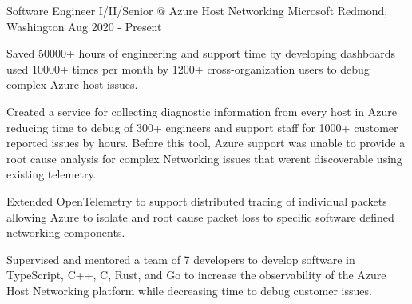 


\begin{cventries}
\cventry
  {Software Engineer I/II/Senior @ Azure Host Networking}
  {Microsoft}
  {Redmond, Washington}
  {Aug 2020 - Present}
  {
    \begin{cvitems}
      \item {Saved 50000+ hours of engineering and support time by developing
        dashboards used 10000+ times per month by 1200+ cross-organization
        users to debug complex Azure host issues.}
      \item {Created a service for collecting diagnostic information from every
        host in Azure reducing time to debug of 300+ engineers and support staff
        for 1000+ customer reported issues by hours. Before this tool, Azure
        support was unable to provide a root cause analysis for complex
        Networking issues that werent discoverable using existing telemetry.}
      \item {Extended OpenTelemetry to support distributed tracing of
        individual packets allowing Azure to isolate and root cause packet loss
        to specific software defined networking components. }
      \item {Supervised and mentored a team of 7 developers to develop software
        in TypeScript, C++, C, Rust, and Go to increase the observability of the
        Azure Host Networking platform while decreasing time to debug customer
        issues.}
    \end{cvitems}
  }


\end{cventries}
